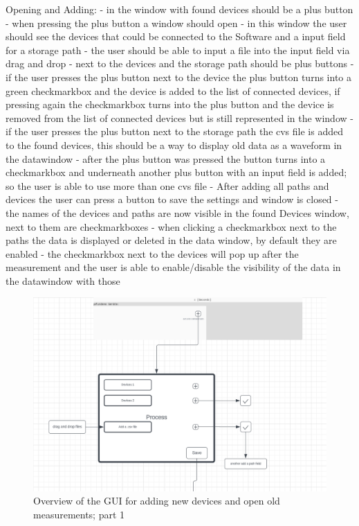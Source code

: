 \documentclass{scrreprt}
\begin{document}
Opening and Adding: 
- in the window with found devices should be a plus button 
- when pressing the plus button a window should open 
- in this window the user should see the devices that could be connected to the Software and a input field for a storage path
- the user should be able to input a file into the input field via drag and drop
- next to the devices and the storage path should be plus buttons
- if the user presses the plus button next to the device the plus button turns into a green checkmarkbox and the device is added to the list of connected devices, if pressing again the checkmarkbox turns into the plus button and the device is removed from the list of connected devices but is still represented in the window 
- if the user presses the plus button next to the storage path the cvs file is added to the found devices, this should be a way to display old data as a waveform in the datawindow  
- after the plus button was pressed the button turns into a checkmarkbox and underneath another plus button with an input field is added; so the user is able to use more than one cvs file 
- After adding all paths and devices the user can press a button to save the settings and window is closed
- the names of the devices and paths are now visible in the found Devices window, next to them are checkmarkboxes 
- when clicking a checkmarkbox next to the paths the data is displayed or deleted in the data window, by default they are enabled
- the checkmarkbox next to the devices will pop up after the measurement and the user is able to enable/disable the visibility of the data in the datawindow with those


\begin{figure}
    \includegraphics[width=.9\textwidth]{./assets/pictures/Open1.png}
    \caption[]{Overview of the GUI for adding new devices and open old measurements; part 1}
    \label{fig:imgopen1}
\end{figure}
\end{document}
